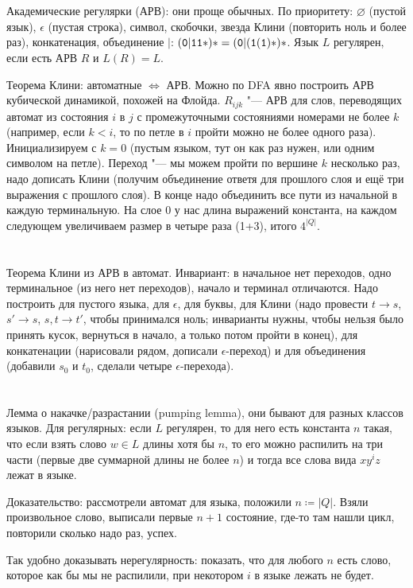 \section{} %
	Академические регулярки (АРВ): они проще обычных.
	По приоритету: $\varnothing$ (пустой язык), $\epsilon$ (пустая строка), символ, скобочки, звезда Клини (повторить ноль и более раз),
	конкатенация, объединение $\mid$: $\t{(0|11*)*}=\t{(0|(1(1)*)*}$.
	Язык $L$ регулярен, если есть АРВ $R$ и $L(R)=L$.

	Теорема Клини: автоматные $\iff$ АРВ.
	Можно по DFA явно построить АРВ кубической динамикой, похожей на Флойда.
	$R_{ijk}$ "--- АРВ для слов, переводящих автомат из состояния $i$ в $j$ с промежуточными состояниями
	номерами не более $k$ (например, если $k<i$, то по петле в $i$ пройти можно не более одного раза).
	Инициализируем с $k=0$ (пустым языком, тут он как раз нужен, или одним символом на петле).
	Переход "--- мы можем пройти по вершине $k$ несколько раз, надо дописать Клини (получим объединение
	ответя для прошлого слоя и ещё три выражения с прошлого слоя).
	В конце надо объединить все пути из начальной в каждую терминальную.
	На слое $0$ у нас длина выражений константа, на каждом следующем увеличиваем размер в четыре раза (1+3),
	итого $4^{|Q|}$.

\section{} %
	Теорема Клини из АРВ в автомат.
	Инвариант: в начальное нет переходов, одно терминальное (из него нет переходов),
	начало и терминал отличаются.
	Надо построить для пустого языка, для $\epsilon$, для буквы, для Клини (надо провести $t \to s$,
	$s' \to s$, $s, t \to t'$, чтобы принимался ноль; инварианты нужны, чтобы нельзя было принять кусок, вернуться
	в начало, а только потом пройти в конец), для конкатенации (нарисовали рядом, дописали $\epsilon$-переход)
	и для объединения (добавили $s_0$ и $t_0$, сделали четыре $\epsilon$-перехода).

\section{} %
	Лемма о накачке/разрастании (pumping lemma), они бывают для разных классов языков.
	Для регулярных: если $L$ регулярен, то для него есть константа $n$ такая,
	что если взять слово $w\in L$ длины хотя бы $n$,
	то его можно распилить на три части (первые две суммарной длины не более $n$) и тогда
	все слова вида $xy^iz$ лежат в языке.

	Доказательство: рассмотрели автомат для языка, положили $n \coloneq |Q|$.
	Взяли произвольное слово, выписали первые $n+1$ состояние, где-то там нашли цикл,
	повторили сколько надо раз, успех.

	Так удобно доказывать нерегулярность: показать, что для любого $n$ есть слово, которое как бы мы не распилили,
	при некотором $i$ в языке лежать не будет.
